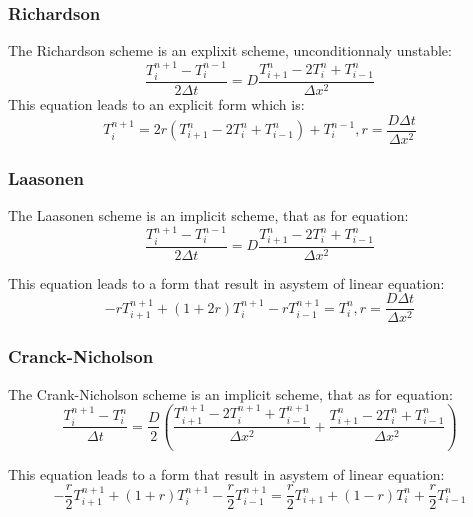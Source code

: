 \documentclass [10 pt, a4 paper]{article}
\begin{document}
\subsubsection{Richardson}
The Richardson scheme is an explixit scheme, unconditionnaly unstable:
\begin{equation}
    \frac{T_{i}^{n+1} - T_{i}^{n-1}}{2\Delta t} = D \frac{T_{i+1}^{n} - 2 T_{i}^{n} + T_{i-1}^{n}}{\Delta x^{2}}
\end{equation}
This equation leads to an explicit form which is:
\begin{equation}
    T_{i}^{n+1} = 2r(T_{i+1}^{n} - 2T_{i}^{n} + T_{i-1}^{n}) + T_{i}^{n-1}, r=\frac{D\Delta t}{\Delta x^{2}}
\end{equation}

\subsubsection{Laasonen}
The Laasonen scheme is an implicit scheme, that as for equation:
\begin{equation}
    \frac{T_{i}^{n+1} - T_{i}^{n-1}}{2\Delta t} = D\frac{T_{i+1}^{n} - 2T_{i}^{n} + T_{i-1}^{n}}{\Delta x^{2}}
\end{equation}

This equation leads to a form that result in asystem of linear equation:
\begin{equation}
    -r T_{i+1}^{n+1} + (1+2r)T_{i}^{n+1} -rT_{i-1}^{n+1} =T_{i}^{n}, r=\frac{D\Delta t}{\Delta x^{2}}
\end{equation}

\subsubsection{Cranck-Nicholson}
The Crank-Nicholson scheme is an implicit scheme, that as for equation:
\begin{equation} 
    \frac{T_{i}^{n+1} - T_{i}^{n}}{\Delta t} = \frac{D}{2}(\frac{T_{i+1}^{n+1}-2T_{i}^{n+1}+T_{i-1}^{n+1}}{\Delta x^{2}} + \frac{T_{i+1}^{n}-2T_{i}^{n}+T_{i-1}^{n}}{\Delta x^{2}})
\end{equation}

This equation leads to a form that result in asystem of linear equation:
\begin{equation}
    -\frac{r}{2} T_{i+1}^{n+1}+(1+r)T_{i}^{n+1}-\frac{r}{2}T_{i-1}^{n+1} = \frac{r}{2}T_{i+1}^{n} + (1-r)T_{i}^{n} + \frac{r}{2}T_{i-1}^{n}
\end{equation}
\quad
\end{document}
